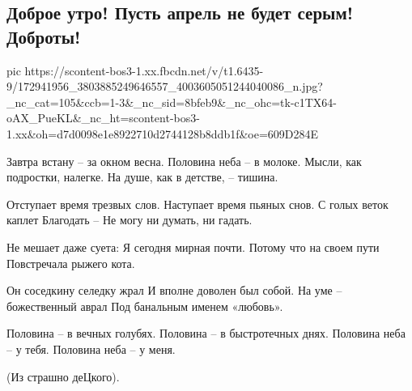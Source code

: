  
 
 
 
 

\subsection{Доброе утро! Пусть апрель не будет серым! Доброты!}
\label{sec:14_04_2021.fb.bilchenko_evgenia.1.aprel_vesna_stihi_dobro}

\ifcmt
  pic https://scontent-bos3-1.xx.fbcdn.net/v/t1.6435-9/172941956_3803885249646557_4003605051244040086_n.jpg?_nc_cat=105&ccb=1-3&_nc_sid=8bfeb9&_nc_ohc=tk-c1TX64-oAX_PueKL&_nc_ht=scontent-bos3-1.xx&oh=d7d0098e1e8922710d2744128b8ddb1f&oe=609D284E
\fi

Завтра встану – за окном весна.
Половина неба – в молоке.
Мысли, как подростки, налегке.
На душе, как в детстве, – тишина.

Отступает время трезвых слов.
Наступает время пьяных снов.
С голых веток каплет Благодать –
Не могу ни думать, ни гадать.

Не мешает даже суета:
Я сегодня мирная почти.
Потому что на своем пути
Повстречала рыжего кота.

Он соседкину селедку жрал
И вполне доволен был собой.
На уме – божественный аврал
Под банальным именем «любовь».

Половина – в вечных голубях.
Половина – в быстротечных днях.
Половина неба – у тебя.
Половина неба – у меня.

(Из страшно деЦкого).
